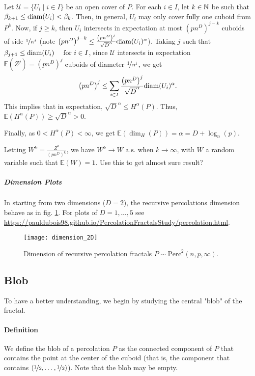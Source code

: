 Let $\mathcal{U} = \{ U_i \mid i \in I \}$ be an open cover of $P$.
For each $i \in I$, let $k \in \mathbb{N}$ be such that $\beta_{k+1} \leq \text{diam}(U_i) < \beta_k$.
Then, in general, $U_i$ may only cover fully one cuboid from $P^k$.
Now, if $j \geq k$, then $U_i$ intersects in expectation at most $\left( p n^D \right)^{j-k}$ cuboids of side $\nicefrac{1}{n^j}$ (note $\left( p n^D \right)^{j-k} \leq \frac{\left( pn^D \right)^j}{\sqrt{D}^{\alpha}} \text{diam}(U_i)^{\alpha}$).
Taking $j$ such that $\beta_{j+1} \leq \text{diam}(U_i) \quad \text{ for } i \in I$, since $\mathcal{U}$ intersects in expectation $\mathbb{E}(Z^j) = \left( p n^D \right)^j$ cuboids of diameter $\nicefrac{1}{n^j}$, we get
$$\left( p n^D \right)^j \leq \sum_{i \in I} \frac{\left( pn^D \right)^j}{\sqrt{D}^{\alpha}} \text{diam}(U_i)^{\alpha}.$$
This implies that in expectation, $\sqrt{D}^{\alpha} \leq H^{\alpha}(P)$.
Thus, $\mathbb{E} \left( H^{\alpha}(P) \right)  \geq \sqrt{D}^{\alpha} > 0$.

Finally, as $0 < H^{\alpha}(P) < \infty$, we get $\mathbb{E}(\dim_H(P)) = \alpha = D + \log_n(p)$.

Letting $W^k = \frac{Z^k}{\left( pn^D \right)^k}$, we have $W^k \to W \text{ a.s. when } k \to \infty$, with $W$ a random variable such that $\mathbb{E}(W) = 1$.
Use this to get almost sure result?

\subparagraph{Dimension Plots}
In starting from two dimensions ($D = 2$), the recursive percolations dimension behave as in fig. \ref{fig:dimension2D}.
For plots of $D = 1,\dots,5$ see \url{https://pauldubois98.github.io/PercolationFractalsStudy/percolation.html}.
\begin{figure}[!h]
	\centering
	\texttt{[image: dimension\_2D]}
	\caption{Dimension of recursive percolation fractals $P \sim \text{Perc}^2(n,p,\infty)$.}
	\label{fig:dimension2D}
\end{figure}

\subsection{Blob}
To have a better understanding, we begin by studying the central "blob" of the fractal.
\paragraph{Definition}
We define the blob of a percolation $P$ as the connected component of $P$ that contains the point at the center of the cuboid (that is, the component that contains $(\nicefrac{1}{2}, \dots, \nicefrac{1}{2})$).
Note that the blob may be empty.

